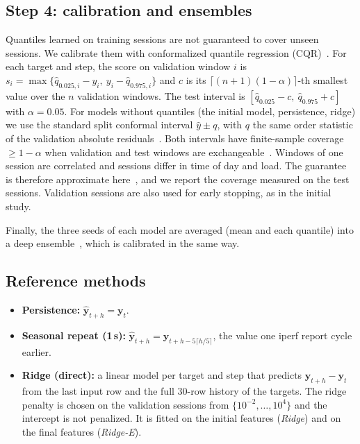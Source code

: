 \subsection{Step 4: calibration and ensembles}
Quantiles learned on training sessions are not guaranteed to cover unseen sessions. We calibrate them with conformalized quantile regression (CQR)~\cite{romano2019conformalized}. For each target and step, the score on validation window $i$ is $s_i=\max\{\hat{q}_{0.025,i}-y_i,\ y_i-\hat{q}_{0.975,i}\}$ and $c$ is its $\lceil (n+1)(1-\alpha)\rceil$-th smallest value over the $n$ validation windows. The test interval is $[\hat{q}_{0.025}-c,\ \hat{q}_{0.975}+c]$ with $\alpha=0.05$. For models without quantiles (the initial model, persistence, ridge) we use the standard split conformal interval $\hat{y}\pm q$, with $q$ the same order statistic of the validation absolute residuals~\cite{lei2018distribution}. Both intervals have finite-sample coverage $\geq 1-\alpha$ when validation and test windows are exchangeable~\cite{lei2018distribution}. Windows of one session are correlated and sessions differ in time of day and load. The guarantee is therefore approximate here~\cite{barber2023conformal}, and we report the coverage measured on the test sessions. Validation sessions are also used for early stopping, as in the initial study.

Finally, the three seeds of each model are averaged (mean and each quantile) into a deep ensemble~\cite{lakshminarayanan2017simple}, which is calibrated in the same way.

\subsection{Reference methods}
\begin{itemize}[leftmargin=*]
  \item \textbf{Persistence:} $\hat{\mathbf{y}}_{t+h}=\mathbf{y}_t$.
  \item \textbf{Seasonal repeat (1\,s):} $\hat{\mathbf{y}}_{t+h}=\mathbf{y}_{t+h-5\lceil h/5\rceil}$, the value one iperf report cycle earlier.
  \item \textbf{Ridge (direct):} a linear model per target and step that predicts $\mathbf{y}_{t+h}-\mathbf{y}_t$ from the last input row and the full 30-row history of the targets. The ridge penalty is chosen on the validation sessions from $\{10^{-2},\dots,10^{4}\}$ and the intercept is not penalized. It is fitted on the initial features (\emph{Ridge}) and on the final features (\emph{Ridge-E}).
\end{itemize}
